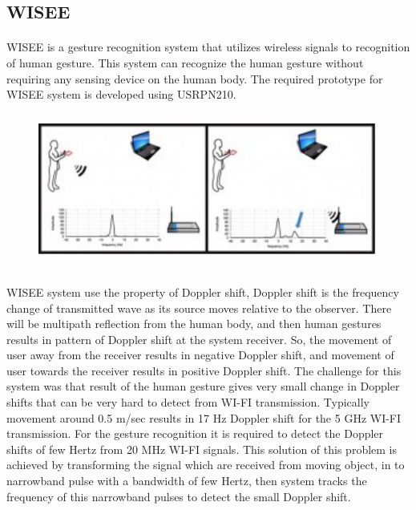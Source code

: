 \documentclass[a4paper,12pt,oneside]{article}
\begin{document}
\subsection{WISEE}
\paragraph{}
WISEE is a gesture recognition system that utilizes wireless signals to recognition of
human gesture. This system can recognize the human gesture without requiring any sensing
device on the human body. The required prototype for WISEE system is developed using USRPN210.

\begin{figure}[H]
\centering
\includegraphics[height=5cm,width=12cm]{2.png}
\end{figure}

\paragraph{}
 WISEE system use the property of Doppler shift, Doppler shift is the frequency change
of transmitted wave as its source moves relative to the observer. There will be multipath
reflection from the human body, and then human gestures results in pattern of Doppler shift at
the system receiver. So, the movement of user away from the receiver results in negative Doppler
shift, and movement of user towards the receiver results in positive Doppler shift. The challenge
for this system was that result of the human gesture gives very small change in Doppler shifts
that can be very hard to detect from WI-FI transmission. Typically movement around 0.5 m/sec
results in 17 Hz Doppler shift for the 5 GHz WI-FI transmission. For the gesture recognition it is
required to detect the Doppler shifts of few Hertz from 20 MHz WI-FI signals. This solution of
this problem is achieved by transforming the signal which are received from moving object, in to
narrowband pulse with a bandwidth of few Hertz, then system tracks the frequency of this
narrowband pulses to detect the small Doppler shift.
\end{document}
